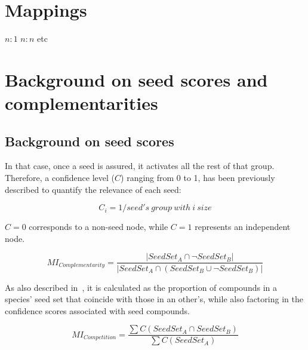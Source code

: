 \documentclass[sn-mathphys,Numbered, lineno]{sn-jnl}  %
\theoremstyle{thmstyleone}%
\theoremstyle{thmstyletwo}%
\theoremstyle{thmstylethree}%
\begin{document}
\begin{appendices}

    \section{Mappings}
    \label{secA1}
        $n:1$
        $n:n$ etc

    \section{Background on seed scores and complementarities}
    \label{secA2}

        \subsection{Background on seed scores}

            In that case, once a seed is assured, it activates all the rest of that group.
            Therefore, a confidence level ($C$) ranging from 0 to 1, has been previously described to quantify the relevance of each seed:

            \begin{equation}
                \label{eq:confidence}
                C_i = 1 / seed's\ group\ with \ i \ size
            \end{equation}

            $C=0$ corresponds to a non-seed node, while $C=1$ represents an independent node. 



            \begin{equation}
                \label{eq:mi_complementarity}
                MI_{Complementarity} = \frac{ | SeedSet_A \cap \neg SeedSet_B | }{ | SeedSet_A \cap (SeedSet_B \cup \neg SeedSet_B) | }
            \end{equation}


            As also described in~\cite{phylomint_ms}, it is calculated as the proportion of compounds in a species' seed set that coincide with those in an other's, while also factoring in the confidence scores associated with seed compounds.

            \begin{equation}
                \label{eq:mi_competition}
                MI_{Competition} = \frac{ \sum C (SeedSet_A \cap SeedSet_B) }{ \sum{ C (SeedSet_A )} }
            \end{equation}



\end{appendices}
\end{document}
